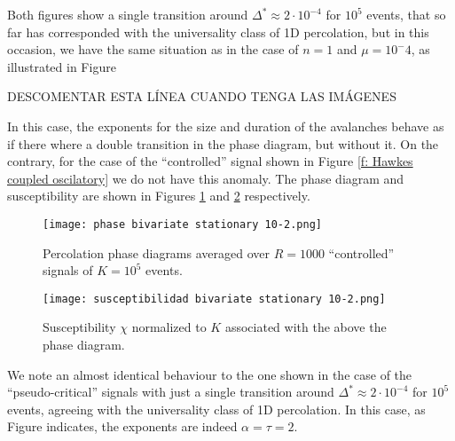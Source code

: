 Both figures show a single transition around $\Delta^*\approx 2\cdot 10^{-4}$ for $10^5$ events, that so far has corresponded with the universality class of 1D percolation, but in this occasion, we have the same 
situation as in the case of $n=1$ and $\mu=10^-4$, as illustrated in Figure %

DESCOMENTAR ESTA LÍNEA CUANDO TENGA LAS IMÁGENES


In this case, the exponents for the size and duration of the avalanches behave as if there where a double transition in the phase diagram, but without it. On the contrary, for the case of 
the ``controlled'' signal shown in Figure \ref{f: Hawkes coupled oscilatory} we do not have this anomaly. The phase diagram and susceptibility are shown in Figures 
\ref{f:phase_diagram_coupled oscilatory} and \ref{f:susceptibilidad_coupled oscilatory} respectively.

\begin{figure}[H]
    \centering
    \texttt{[image: phase bivariate stationary 10-2.png]}
    \caption{Percolation phase diagrams averaged over $R=1000$ ``controlled'' signals of $K=10^5$ events.}
    \label{f:phase_diagram_coupled oscilatory}
\end{figure}

\begin{figure}[H]
    \centering
    \texttt{[image: susceptibilidad bivariate stationary 10-2.png]}
    \caption{Susceptibility $\chi$ normalized to $K$ associated with the above the phase diagram.}
    \label{f:susceptibilidad_coupled oscilatory}
\end{figure}

We note an almost identical behaviour to the one shown in the case of the ``pseudo-critical'' signals with just a single transition around $\Delta^*\approx 2\cdot 10^{-4}$ for $10^5$ events, 
agreeing with the universality class of 1D percolation. In this case, as Figure %
indicates, the exponents are indeed $\alpha=\tau=2$.


